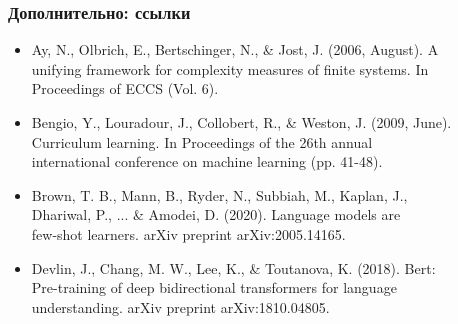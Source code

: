 \documentclass{beamer}
\begin{document}
\begin{frame}[label=supplemental,noframenumbering]
	\frametitle{Дополнительно: ссылки}
	\begin{itemize}
		\item Ay, N., Olbrich, E., Bertschinger, N., \& Jost, J. (2006, August). A\\\hspace{1cm}unifying framework for
		complexity measures of finite systems. In\\\hspace{1cm}Proceedings of ECCS (Vol. 6).
		\item Bengio, Y., Louradour, J., Collobert, R., \& Weston, J. (2009, June).\\\hspace{1cm}Curriculum learning. In
		Proceedings of the 26th annual \\\hspace{1cm}international conference on machine learning (pp.
		41-48).
		\item Brown, T. B., Mann, B., Ryder, N., Subbiah, M., Kaplan, J., \\\hspace{1cm}Dhariwal, P., ... \& Amodei, D.
		(2020). Language models are\\\hspace{1cm}few-shot learners. arXiv preprint arXiv:2005.14165.
		\item Devlin, J., Chang, M. W., Lee, K., \& Toutanova, K. (2018). Bert: \\\hspace{1cm}Pre-training of deep
		bidirectional transformers for language\\\hspace{1cm} understanding. arXiv preprint
		arXiv:1810.04805.
	\end{itemize}
\end{frame}
\end{document}
